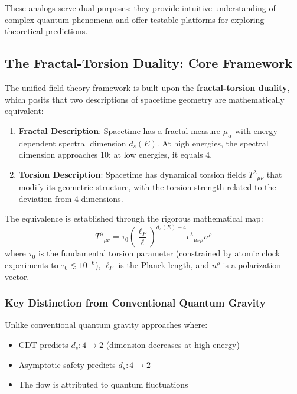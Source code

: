 \documentclass[UTF8]{ctex}\n\documentclass[12pt,a4paper]{article}
\begin{document}
These analogs serve dual purposes: they provide intuitive understanding of complex quantum phenomena and offer testable platforms for exploring theoretical predictions.

\subsection{The Fractal-Torsion Duality: Core Framework}

The unified field theory framework \cite{wang2026} is built upon the \textbf{fractal-torsion duality}, which posits that two descriptions of spacetime geometry are mathematically equivalent:

\begin{enumerate}
    \item \textbf{Fractal Description}: Spacetime has a fractal measure $\mu_\alpha$ with energy-dependent spectral dimension $d_s(E)$. At high energies, the spectral dimension approaches 10; at low energies, it equals 4.
    \item \textbf{Torsion Description}: Spacetime has dynamical torsion fields $T^\lambda{}_{\mu\nu}$ that modify its geometric structure, with the torsion strength related to the deviation from 4 dimensions.
\end{enumerate}

The equivalence is established through the rigorous mathematical map:
\begin{equation}
    T^\lambda{}_{\mu\nu} = \tau_0 \left(\frac{\ell_P}{\ell}\right)^{d_s(E)-4} \epsilon^\lambda{}_{\mu\nu\rho} n^\rho
    \label{eq:duality_map}
\end{equation}
where $\tau_0$ is the fundamental torsion parameter (constrained by atomic clock experiments to $\tau_0 \lesssim 10^{-6}$), $\ell_P$ is the Planck length, and $n^\rho$ is a polarization vector.

\subsubsection{Key Distinction from Conventional Quantum Gravity}

Unlike conventional quantum gravity approaches where:
\begin{itemize}
    \item CDT predicts $d_s: 4 \to 2$ (dimension decreases at high energy)
    \item Asymptotic safety predicts $d_s: 4 \to 2$ 
    \item The flow is attributed to quantum fluctuations
\end{itemize}
\end{document}
